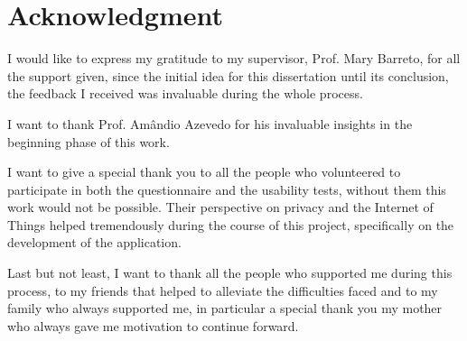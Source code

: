 %
%
\chapter*{Acknowledgment}

I would like to express my gratitude to my supervisor, Prof. Mary Barreto, for
all the support given, since the initial idea for this dissertation until its conclusion,
the feedback I received was invaluable during the whole process.

I want to thank Prof. Amândio Azevedo for his invaluable insights in the beginning phase of
this work.

I want to give a special thank you to all the people who volunteered to
participate in both the questionnaire and the usability tests, without them this work
would not be possible. Their perspective on privacy and the Internet of Things helped
tremendously during the course of this project, specifically on the development of the application.

Last but not least, I want to thank all the people who supported me during this
process, to my friends that helped to alleviate the difficulties faced and
to my family who always supported me, in particular a special thank you my mother
who always gave me motivation to continue forward.
